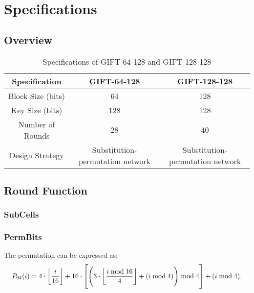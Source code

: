 \chapter{Specifications}

\section*{Overview}

\begin{table}[h]
	\centering
	\begin{tabular}{|c||c|c|}
		\hline
		\textbf{Specification} & \textbf{GIFT-64-128} & \textbf{GIFT-128-128} \\ \hline
		Block Size (bits)      & 64                   & 128                   \\ \hline
		Key Size (bits)        & 128                  & 128                   \\ \hline
		Number of Rounds       & 28                   & 40                    \\ \hline
		Design Strategy        & Substitution-permutation network & Substitution-permutation network \\ \hline
	\end{tabular}
	\caption{Specifications of GIFT-64-128 and GIFT-128-128}
	\label{table:gift-specifications}
\end{table}

\newpage
\section{Round Function}

\subsection{SubCells}

\begin{table}[h]
	\caption{Specifications of $\gift$ Sbox $GS$}
	\label{table:gift-sbox}
\end{table}

\subsection{PermBits}
The permutation can be expressed as: \[
P_{64}(i)=4\cdot\floor*{\frac{i}{16}}+16\cdot\left[\left(3\cdot\floor*{\frac{i\bmod 16}{4}}+(i\bmod 4)\right)\bmod 4\right] + (i\bmod 4).
\]


